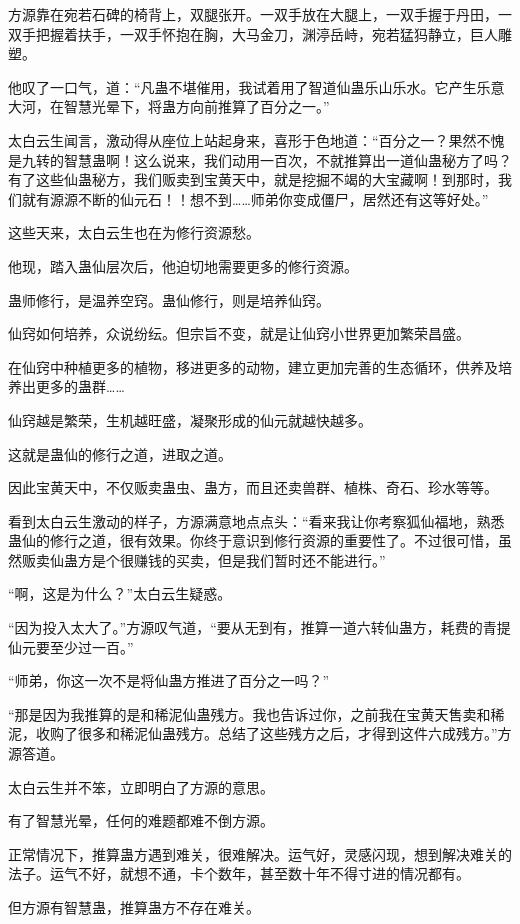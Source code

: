 \begin{this_body}
方源靠在宛若石碑的椅背上，双腿张开。一双手放在大腿上，一双手握于丹田，一双手把握着扶手，一双手怀抱在胸，大马金刀，渊渟岳峙，宛若猛犸静立，巨人雕塑。

他叹了一口气，道：“凡蛊不堪催用，我试着用了智道仙蛊乐山乐水。它产生乐意大河，在智慧光晕下，将蛊方向前推算了百分之一。”

太白云生闻言，激动得从座位上站起身来，喜形于色地道：“百分之一？果然不愧是九转的智慧蛊啊！这么说来，我们动用一百次，不就推算出一道仙蛊秘方了吗？有了这些仙蛊秘方，我们贩卖到宝黄天中，就是挖掘不竭的大宝藏啊！到那时，我们就有源源不断的仙元石！！想不到……师弟你变成僵尸，居然还有这等好处。”

这些天来，太白云生也在为修行资源愁。

他现，踏入蛊仙层次后，他迫切地需要更多的修行资源。

蛊师修行，是温养空窍。蛊仙修行，则是培养仙窍。

仙窍如何培养，众说纷纭。但宗旨不变，就是让仙窍小世界更加繁荣昌盛。

在仙窍中种植更多的植物，移进更多的动物，建立更加完善的生态循环，供养及培养出更多的蛊群……

仙窍越是繁荣，生机越旺盛，凝聚形成的仙元就越快越多。

这就是蛊仙的修行之道，进取之道。

因此宝黄天中，不仅贩卖蛊虫、蛊方，而且还卖兽群、植株、奇石、珍水等等。

看到太白云生激动的样子，方源满意地点点头：“看来我让你考察狐仙福地，熟悉蛊仙的修行之道，很有效果。你终于意识到修行资源的重要性了。不过很可惜，虽然贩卖仙蛊方是个很赚钱的买卖，但是我们暂时还不能进行。”

“啊，这是为什么？”太白云生疑惑。

“因为投入太大了。”方源叹气道，“要从无到有，推算一道六转仙蛊方，耗费的青提仙元要至少过一百。”

“师弟，你这一次不是将仙蛊方推进了百分之一吗？”

“那是因为我推算的是和稀泥仙蛊残方。我也告诉过你，之前我在宝黄天售卖和稀泥，收购了很多和稀泥仙蛊残方。总结了这些残方之后，才得到这件六成残方。”方源答道。

太白云生并不笨，立即明白了方源的意思。

有了智慧光晕，任何的难题都难不倒方源。

正常情况下，推算蛊方遇到难关，很难解决。运气好，灵感闪现，想到解决难关的法子。运气不好，就想不通，卡个数年，甚至数十年不得寸进的情况都有。

但方源有智慧蛊，推算蛊方不存在难关。


\end{this_body}
